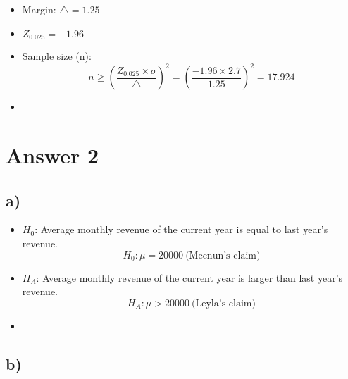 \documentclass[12pt]{article}
\begin{document}
\begin{itemize}
    
    \item[] Margin: \( \bigtriangleup = 1.25 \)

    \item[] \( Z_{0.025} = -1.96 \)

    \item[] Sample size (n):
    \[ n \ge \left( \frac{Z_{0.025} \times \sigma}{\bigtriangleup} \right)^2 = \left( \frac{-1.96 \times 2.7}{1.25} \right)^2 = 17.924 \]

    \item[] 
    
\end{itemize}





\section*{Answer 2}


\subsection*{a)} 


\begin{itemize}
    
    \item[] \(H_0\): Average monthly revenue of the current year is equal to last year's revenue.
    \[ H_0: \mu = 20000 \ \text{(Mecnun's claim)} \]

    \item[] \(H_A\): Average monthly revenue of the current year is larger than last year's revenue.
    \[ H_A: \mu > 20000 \ \text{(Leyla's claim)} \]

    \item[] 
    
\end{itemize}




\subsection*{b)} 
\end{document}
